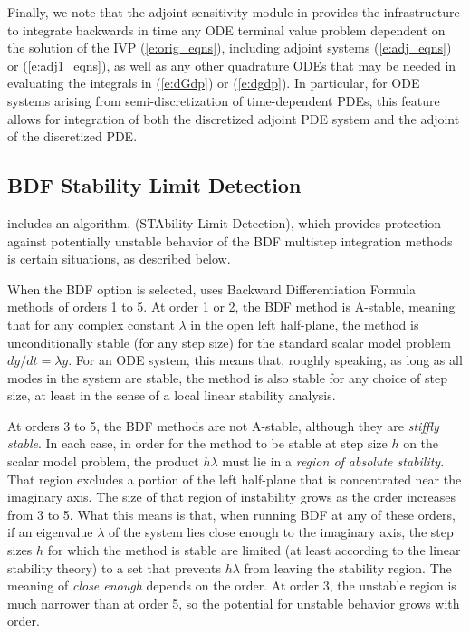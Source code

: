 \bigskip

Finally, we note that the adjoint sensitivity module in {\cvodes} provides the 
infrastructure to integrate backwards in time any ODE terminal value problem
dependent on the solution of the IVP (\ref{e:orig_eqns}), including
adjoint systems (\ref{e:adj_eqns}) or (\ref{e:adj1_eqns}), as well as any other
quadrature ODEs that may be needed in evaluating the integrals in (\ref{e:dGdp}) 
or (\ref{e:dgdp}). In particular, for ODE systems arising from semi-discretization
of time-dependent PDEs, this feature allows for integration of both the 
discretized adjoint PDE system and the adjoint of the discretized PDE.


\subsection{BDF Stability Limit Detection}

{\cvodes} includes an algorithm, {\stald} (STAbility Limit Detection),
which provides protection against potentially unstable behavior of the 
BDF multistep integration methods is certain situations, as described below.

When the BDF option is selected, {\cvodes} uses Backward Differentiation 
Formula methods of orders 1 to 5.  At order 1 or 2, the BDF
method is A-stable, meaning that for any complex constant $\lambda$ in
the open left half-plane, the method is unconditionally stable (for
any step size) for the standard scalar model problem $dy/dt = \lambda y$.
For an ODE system, this means that, roughly speaking, as long as all
modes in the system are stable, the method is also stable for any
choice of step size, at least in the sense of a local linear stability
analysis.

At orders 3 to 5, the BDF methods are not A-stable, although they are
{\em stiffly stable}. In each case, in order for the method to be stable
at step size $h$ on the scalar model problem, the product $h\lambda$ must
lie in a {\em region of absolute stability}. 
That region excludes a portion of the left half-plane that is concentrated 
near the imaginary axis.  The size of that region of instability grows as the order
increases from 3 to 5.  What this means is that, when running BDF at
any of these orders, if an eigenvalue $\lambda$ of the system lies close
enough to the imaginary axis, the step sizes $h$ for which the method is
stable are limited (at least according to the linear stability theory)
to a set that prevents $h\lambda$ from leaving the stability region.
The meaning of {\em close enough} depends on the order.  
At order 3, the unstable region is much narrower than at order 5, 
so the potential for unstable behavior grows with order.

